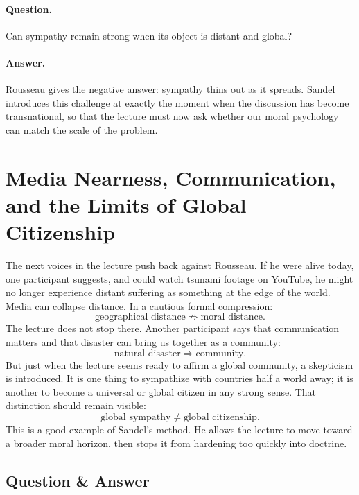 \paragraph{Question.} Can sympathy remain strong when its object is distant and global?

\paragraph{Answer.} Rousseau gives the negative answer: sympathy thins out as it spreads. Sandel introduces this challenge at exactly the moment when the discussion has become transnational, so that the lecture must now ask whether our moral psychology can match the scale of the problem.

\section{Media Nearness, Communication, and the Limits of Global Citizenship}

The next voices in the lecture push back against Rousseau. If he were alive today, one participant suggests, and could watch tsunami footage on YouTube, he might no longer experience distant suffering as something at the edge of the world. Media can collapse distance. In a cautious formal compression:
\begin{equation}
\text{geographical distance}
\not\Rightarrow
\text{moral distance}.
\end{equation}
The lecture does not stop there. Another participant says that communication matters and that disaster can bring us together as a community:
\begin{equation}
\text{natural disaster}
\Longrightarrow
\text{community}.
\end{equation}
But just when the lecture seems ready to affirm a global community, a skepticism is introduced. It is one thing to sympathize with countries half a world away; it is another to become a universal or global citizen in any strong sense. That distinction should remain visible:
\begin{equation}
\text{global sympathy}
\neq
\text{global citizenship}.
\end{equation}
This is a good example of Sandel's method. He allows the lecture to move toward a broader moral horizon, then stops it from hardening too quickly into doctrine.

\subsection{Question \& Answer}

